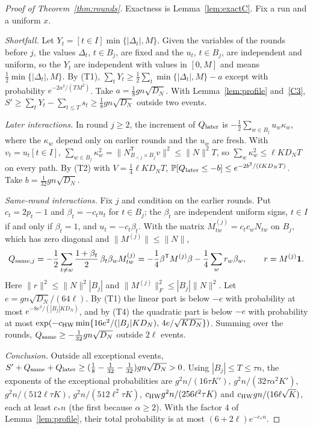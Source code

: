 \documentclass[11pt,a4paper]{article}
\theoremstyle{definition}
\theoremstyle{remark}
\newcommand{\Prb}{\mathbb P}
\newcommand{\one}{\mathbf 1}
\begin{document}
\begin{proof}[Proof of Theorem~\ref{thm:rounds}]
Exactness is Lemma~\ref{lem:exactC}. Fix a run and a uniform $x$.

\emph{Shortfall.} Let $Y_t=[t\in I]\min\{|\Delta_t|,M\}$. Given the variables of
the rounds before $j$, the values $\Delta_t$, $t\in B_j$, are fixed and the $u_t$,
$t\in B_j$, are independent and uniform, so the $Y_t$ are independent with values
in $[0,M]$ and means $\frac12\min\{|\Delta_t|,M\}$. By (T1),
$\sum_tY_t\ge\frac12\sum_t\min\{|\Delta_t|,M\}-a$ except with probability
$e^{-2a^2/(TM^2)}$. Take $a=\frac18gn\sqrt{D_N}$. With Lemma~\ref{lem:profile}
and~\eqref{C3}, $S'\ge\sum_tY_t-\sum_{t\le T}s_t\ge\frac18gn\sqrt{D_N}$ outside
two events.

\emph{Later interactions.} In round $j\ge2$, the increment of $Q_{\rm later}$ is
$-\frac12\sum_{w\in B_j}u_w\kappa_w$, where the $\kappa_w$ depend only on earlier
rounds and the $u_w$ are fresh. With $v_t=u_t[t\in I]$,
$\sum_{w\in B_j}\kappa_w^2=\|N_{B_{<j}\times B_j}^{\mathsf T}v\|^2\le\|N\|^2T$, so
$\sum_w\kappa_w^2\le\ell KD_NT$ on every path. By (T2) with $V=\frac14\ell KD_NT$,
$\Prb[Q_{\rm later}\le-b]\le e^{-2b^2/(\ell KD_NT)}$. Take
$b=\frac1{32}gn\sqrt{D_N}$.

\emph{Same-round interactions.} Fix $j$ and condition on the earlier rounds. Put
$c_t=2p_t-1$ and $\beta_t=-c_tu_t$ for $t\in B_j$; the $\beta_t$ are independent
uniform signs, $t\in I$ if and only if $\beta_t=1$, and $u_t=-c_t\beta_t$. With
the matrix $M^{(j)}_{tw}=c_tc_wN_{tw}$ on $B_j$, which has zero diagonal and
$\|M^{(j)}\|\le\|N\|$,
\[
 Q_{{\rm same},j}=-\frac12\sum_{t\ne w}\frac{1+\beta_t}2\,\beta_t\beta_wM^{(j)}_{tw}
 =-\frac14\beta^{\mathsf T}M^{(j)}\beta-\frac14\sum_w r_w\beta_w,\qquad
 r=M^{(j)}\one.
\]
Here $\|r\|^2\le\|N\|^2|B_j|$ and $\|M^{(j)}\|_F^2\le|B_j|\|N\|^2$. Let
$e=gn\sqrt{D_N}/(64\ell)$. By (T1) the linear part is below $-e$ with probability
at most $e^{-8e^2/(|B_j|KD_N)}$, and by (T4) the quadratic part is below $-e$ with
probability at most $\exp(-c_{\rm HW}\min\{16e^2/(|B_j|KD_N),\,4e/\sqrt{KD_N}\})$.
Summing over the rounds, $Q_{\rm same}\ge-\frac1{32}gn\sqrt{D_N}$ outside $2\ell$
events.

\emph{Conclusion.} Outside all exceptional events,
$S'+Q_{\rm same}+Q_{\rm later}\ge(\frac18-\frac1{32}-\frac1{32})gn\sqrt{D_N}>0$.
Using $|B_j|\le T\le\tau n$, the exponents of the exceptional probabilities are
$g^2n/(16\tau K')$, $g^2n/(32\tau\alpha^2K')$, $g^2n/(512\ell\tau K)$,
$g^2n/(512\ell^2\tau K)$, $c_{\rm HW}g^2n/(256\ell^2\tau K)$ and
$c_{\rm HW}gn/(16\ell\sqrt K)$, each at least $c_*n$ (the first because
$\alpha\ge2$). With the factor $4$ of Lemma~\ref{lem:profile}, their total
probability is at most $(6+2\ell)e^{-c_*n}$.
\end{proof}
\end{document}
